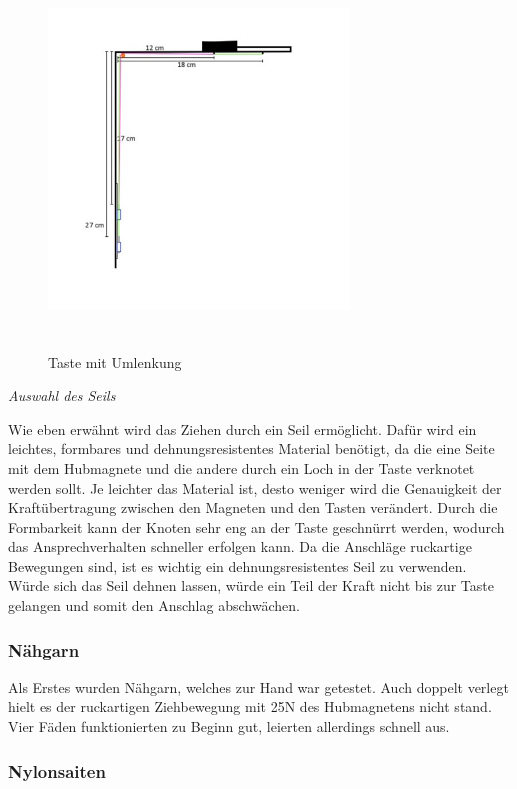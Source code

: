 \begin{enumerate}
\begin{figure}[htbp]
	\centering
	\includegraphics [width=8cm, height=10cm] {img/mitUmlenkung_locker}
	\caption{Taste mit Umlenkung}
	\label{<label>}
\end{figure}


\textit{Auswahl des Seils}

Wie eben erwähnt wird das Ziehen durch ein Seil ermöglicht.
Dafür wird ein leichtes, formbares und dehnungsresistentes Material benötigt, da die eine Seite mit dem Hubmagnete und die andere durch ein Loch in der Taste verknotet werden sollt.
Je leichter das Material ist, desto weniger wird die Genauigkeit der Kraftübertragung zwischen den Magneten und den Tasten verändert.
Durch die Formbarkeit kann der Knoten sehr eng an der Taste geschnürrt werden, wodurch das Ansprechverhalten schneller erfolgen kann.
Da die Anschläge ruckartige Bewegungen sind, ist es wichtig ein dehnungsresistentes Seil zu verwenden.
Würde sich das Seil dehnen lassen, würde ein Teil der Kraft nicht bis zur Taste gelangen und somit den Anschlag abschwächen.

\subsubsection{Nähgarn}

Als Erstes wurden Nähgarn, welches zur Hand war getestet.
Auch doppelt verlegt hielt es der ruckartigen Ziehbewegung mit 25N des Hubmagnetens nicht stand.
Vier Fäden funktionierten zu Beginn gut, leierten allerdings schnell aus.

\subsubsection{Nylonsaiten}


\end{enumerate}
